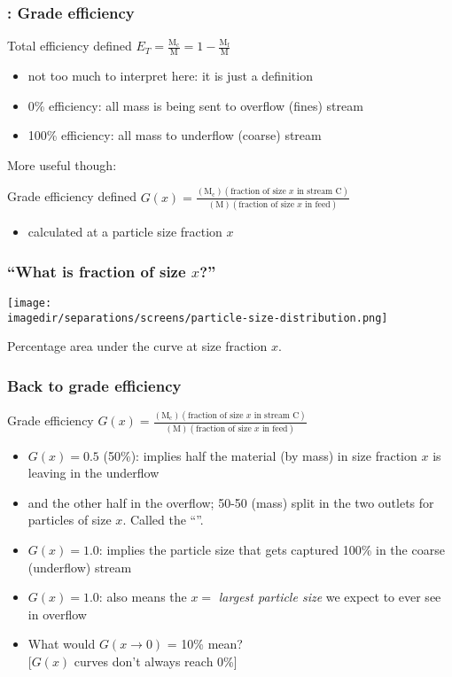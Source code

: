 \begin{frame}\frametitle{{\color{myOrange}{Concept}}: Grade efficiency}
	\begin{exampleblock}{Total efficiency defined}
		$E_T = \displaystyle \frac{\text{M}_\text{c}}{\text{M}} = 1 - \displaystyle \frac{\text{M}_\text{f}}{\text{M}}$
	\end{exampleblock}	
	\begin{itemize}
		\item	not too much to interpret here: it is just a definition
		\item	0\% efficiency: all mass is being sent to overflow (fines) stream
		\item	100\% efficiency: all mass to underflow (coarse) stream
	\end{itemize}
	\vspace{12pt}
	More useful though:
	\begin{exampleblock}{Grade efficiency defined}
		$G(x) = \displaystyle \frac{(\text{M}_\text{c})(\text{fraction of size $x$ in stream C})}{(\text{M})(\text{fraction of size $x$ in feed})}$
	\end{exampleblock}
	\begin{itemize}
		\item	calculated at a particle size fraction $x$
	\end{itemize}	
\end{frame}

\begin{frame}\frametitle{``What is fraction of size $x$?''}	
	\begin{center}
		\texttt{[image: \\imagedir/separations/screens/particle-size-distribution.png]}
	\end{center}
	Percentage area under the curve at size fraction $x$.
\end{frame}

\begin{frame}\frametitle{Back to grade efficiency}
	\begin{exampleblock}{Grade efficiency}
		$G(x) = \displaystyle \frac{(\text{M}_\text{c})(\text{fraction of size $x$ in stream C})}{(\text{M})(\text{fraction of size $x$ in feed})}$
	\end{exampleblock}
	\begin{itemize}
		\item	$G(x) = 0.5$ (50\%): implies half the material (by mass) in size fraction $x$ is leaving in the underflow
		\item	and the other half in the overflow; 50-50 (mass) split in the two outlets for particles of size $x$. Called the ``{\color{purple}{cut size}}''.
		\item	$G(x) = 1.0$: implies the particle size that gets captured 100\%  in the coarse (underflow) stream
		\item	$G(x) = 1.0$: also means the $x=$ \emph{largest particle size} we expect to ever see in overflow
		\item	\adv What would $G(x \rightarrow 0)$ = 10\% mean? \\{\scriptsize [$G(x)$ curves don't always reach 0\%]}
	\end{itemize}	
\end{frame}

